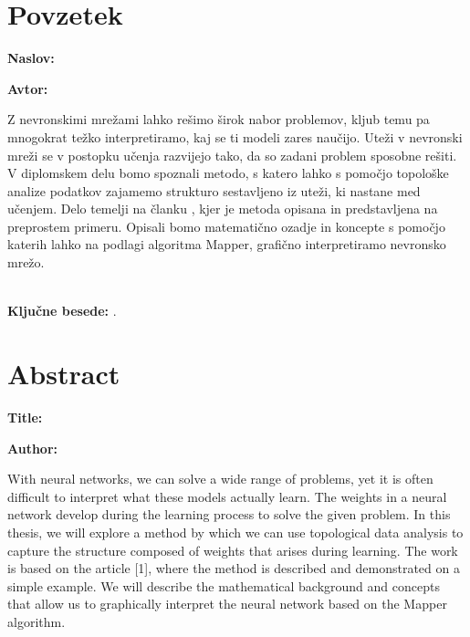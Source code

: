 \clearemptydoublepage

\chapter*{Povzetek}

\noindent\textbf{Naslov:} \ttitle
\bigskip

\noindent\textbf{Avtor:} \tauthor
\bigskip

\noindent Z nevronskimi mrežami lahko rešimo širok nabor problemov, kljub temu pa mnogokrat težko interpretiramo, kaj se ti modeli zares naučijo. Uteži v nevronski mreži se v postopku učenja razvijejo tako, da so zadani problem sposobne rešiti. V diplomskem delu bomo spoznali metodo, s katero lahko s pomočjo topološke analize podatkov zajamemo strukturo sestavljeno iz uteži, ki nastane med učenjem. Delo temelji na članku \cite{Gabella_2021}, kjer je metoda opisana in predstavljena na preprostem primeru. Opisali bomo matematično ozadje in koncepte s pomočjo katerih lahko na podlagi algoritma Mapper, grafično interpretiramo nevronsko mrežo.  \\ \\


\bigskip

\noindent\textbf{Ključne besede:} \tkeywords.
\clearemptydoublepage

\chapter*{Abstract}

\noindent\textbf{Title:} \ttitleEn
\bigskip

\noindent\textbf{Author:} \tauthor
\bigskip

\noindent With neural networks, we can solve a wide range of problems, yet it is often difficult to interpret what these models actually learn. The weights in a neural network develop during the learning process to solve the given problem. In this thesis, we will explore a method by which we can use topological data analysis to capture the structure composed of weights that arises during learning. The work is based on the article [1], where the method is described and demonstrated on a simple example. We will describe the mathematical background and concepts that allow us to graphically interpret the neural network based on the Mapper algorithm.
\bigskip

